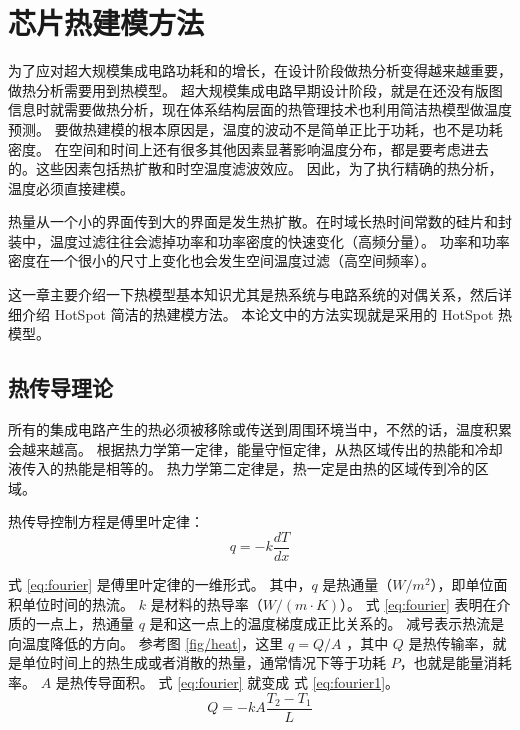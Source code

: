
\chapter{芯片热建模方法}

为了应对超大规模集成电路功耗和的增长，在设计阶段做热分析变得越来越重要，做热分析需要用到热模型。
超大规模集成电路早期设计阶段，就是在还没有版图信息时就需要做热分析，现在体系结构层面的热管理技术也利用简洁热模型做温度预测。
要做热建模的根本原因是，温度的波动不是简单正比于功耗，也不是功耗密度。
在空间和时间上还有很多其他因素显著影响温度分布，都是要考虑进去的。这些因素包括热扩散和时空温度滤波效应。
因此，为了执行精确的热分析，温度必须直接建模。

热量从一个小的界面传到大的界面是发生热扩散。在时域长热时间常数的硅片和封装中，温度过滤往往会滤掉功率和功率密度的快速变化（高频分量）。
功率和功率密度在一个很小的尺寸上变化也会发生空间温度过滤（高空间频率）。

这一章主要介绍一下热模型基本知识尤其是热系统与电路系统的对偶关系，然后详细介绍 HotSpot 简洁的热建模方法。
本论文中的方法实现就是采用的 HotSpot 热模型。

\section{热传导理论}\label{sec:thermal}
所有的集成电路产生的热必须被移除或传送到周围环境当中，不然的话，温度积累会越来越高。
根据热力学第一定律，能量守恒定律，从热区域传出的热能和冷却液传入的热能是相等的。
热力学第二定律是，热一定是由热的区域传到冷的区域。

热传导控制方程是傅里叶定律：
\begin{equation}\label{eq:fourier}
q = -k\frac{dT}{dx}
\end{equation}

式 \eqref{eq:fourier} 是傅里叶定律的一维形式。
其中，$ q $ 是热通量（$W/m^2$），即单位面积单位时间的热流。 $k $ 是材料的热导率（$W/(m \cdot K)$）。
式 \eqref{eq:fourier} 表明在介质的一点上，热通量 $q$ 是和这一点上的温度梯度成正比关系的。
减号表示热流是向温度降低的方向。
参考图 \ref{fig/heat}，这里 $q = Q/A $ ，其中 $Q$ 是热传输率，就是单位时间上的热生成或者消散的热量，通常情况下等于功耗 $P$，也就是能量消耗率。 
$A$ 是热传导面积。 式 \eqref{eq:fourier} 就变成 式 \eqref{eq:fourier1}。
\begin{equation}\label{eq:fourier1}
Q = -kA\frac{T_2-T_1}{L}
\end{equation}

